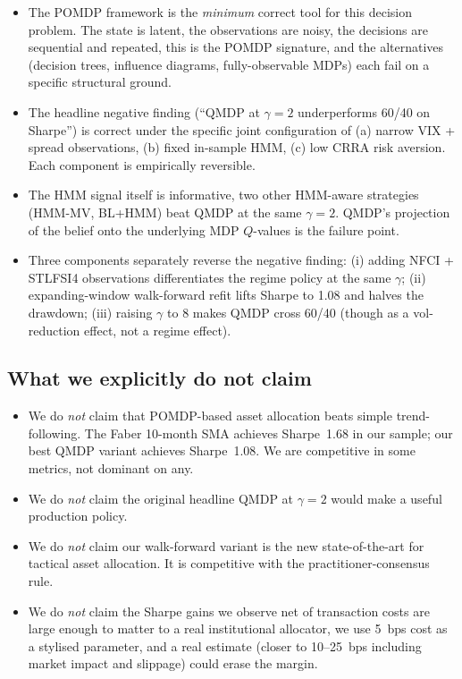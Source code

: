 \documentclass[11pt]{article}
\begin{document}
\begin{itemize}
  \item The POMDP framework is the \emph{minimum} correct tool for this decision problem. The state is latent, the observations are noisy, the decisions are sequential and repeated, this is the POMDP signature, and the alternatives (decision trees, influence diagrams, fully-observable MDPs) each fail on a specific structural ground.
  \item The headline negative finding (``QMDP at $\gamma = 2$ underperforms 60/40 on Sharpe'') is correct under the specific joint configuration of (a) narrow VIX + spread observations, (b) fixed in-sample HMM, (c) low CRRA risk aversion. Each component is empirically reversible.
  \item The HMM signal itself is informative, two other HMM-aware strategies (HMM-MV, BL+HMM) beat QMDP at the same $\gamma = 2$. QMDP's projection of the belief onto the underlying MDP $Q$-values is the failure point.
  \item Three components separately reverse the negative finding: (i) adding NFCI + STLFSI4 observations differentiates the regime policy at the same $\gamma$; (ii) expanding-window walk-forward refit lifts Sharpe to 1.08 and halves the drawdown; (iii) raising $\gamma$ to 8 makes QMDP cross 60/40 (though as a vol-reduction effect, not a regime effect).
\end{itemize}

\subsection{What we explicitly do not claim}

\begin{itemize}
  \item We do \emph{not} claim that POMDP-based asset allocation beats simple trend-following. The Faber 10-month SMA achieves Sharpe~1.68 in our sample; our best QMDP variant achieves Sharpe~1.08. We are competitive in some metrics, not dominant on any.
  \item We do \emph{not} claim the original headline QMDP at $\gamma = 2$ would make a useful production policy.
  \item We do \emph{not} claim our walk-forward variant is the new state-of-the-art for tactical asset allocation. It is competitive with the practitioner-consensus rule.
  \item We do \emph{not} claim the Sharpe gains we observe net of transaction costs are large enough to matter to a real institutional allocator, we use 5~bps cost as a stylised parameter, and a real estimate (closer to 10--25~bps including market impact and slippage) could erase the margin.
\end{itemize}
\end{document}
